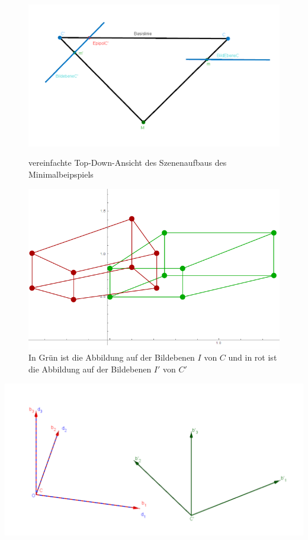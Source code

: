 \begin{figure}[!htb]
	\includegraphics[width=\linewidth]{images/AufbauMinimalbeispiel.png}
	\caption{vereinfachte Top-Down-Ansicht des Szenenaufbaus des Minimalbeipspiels}
	\label{fig:awesome_image1}
	\endminipage\hfill
	\includegraphics[width=\linewidth]{images/QuadrateMinimalBeispiel.png}
	\caption{In Grün ist die Abbildung auf der Bildebenen $I$ von $C$ und in rot ist die Abbildung auf der Bildebenen $I'$ von $C'$}
	\label{fig:awesome_image2}
	\endminipage\hfill
\end{figure}

\begin{minipage}{\linewidth}
	\centering
	\includegraphics[width=.52\linewidth]{images/KS_Minimalbeispiel.png}
\end{minipage}\\ \\

